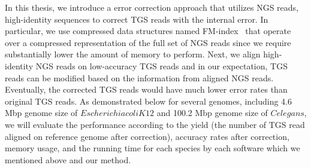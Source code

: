 In this thesis, we introduce a error correction approach that utilizes NGS reads, high-identity sequences to correct TGS reads with the internal error. In particular, we use compressed data structures named FM-index~\cite{pmid20529929} that operate over a compressed representation of the full set of NGS reads since we require substantially lower the amount of memory to perform. Next, we align high-identity NGS reads on low-accuracy TGS reads and in our expectation, TGS reads can be modified based on the information from aligned NGS reads. Eventually, the corrected TGS reads would have much lower error rates than original TGS reads. As demonstrated below for several genomes, including 4.6 Mbp genome size of $Escherichia coli K12$ and 100.2 Mbp genome size of $C elegans$, we will evaluate the performance according to the yield (the number of TGS read aligned on reference genome after correction), accuracy rates after correction, memory usage, and the running time for each species by each software which we mentioned above and our method.